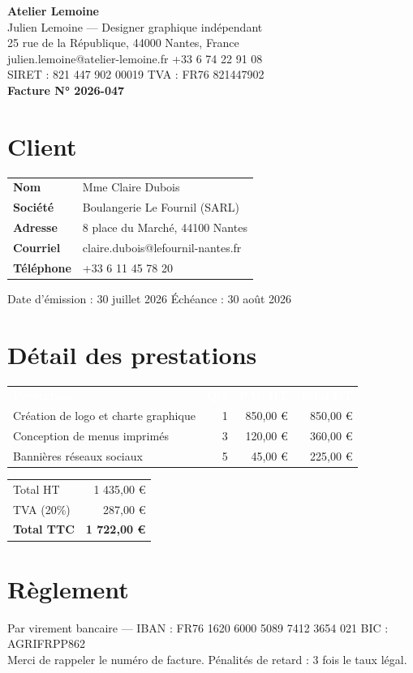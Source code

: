 \documentclass[11pt,a4paper]{article}
\begin{document}
{\Huge\bfseries\color{accent} Atelier Lemoine}\\[0.2em]
{\normalsize Julien Lemoine — Designer graphique indépendant}\\
25 rue de la République, 44000 Nantes, France\\
julien.lemoine@atelier-lemoine.fr \quad +33 6 74 22 91 08\\
SIRET : 821 447 902 00019 \quad TVA : FR76 821447902\\[0.8em]
{\LARGE\bfseries Facture N° 2026-047}

\section{Client}
\begin{tabularx}{\linewidth}{@{}>{\bfseries}l X@{}}
Nom & Mme Claire Dubois \\
Société & Boulangerie Le Fournil (SARL) \\
Adresse & 8 place du Marché, 44100 Nantes \\
Courriel & claire.dubois@lefournil-nantes.fr \\
Téléphone & +33 6 11 45 78 20 \\
\end{tabularx}

\vspace{0.5em}
Date d'émission : 30 juillet 2026 \quad Échéance : 30 août 2026

\section{Détail des prestations}
\begin{tabularx}{\linewidth}{@{}X r r r@{}}
\rowcolor{accent}\textcolor{white}{\textbf{Prestation}} & \textcolor{white}{\textbf{Qté}} & \textcolor{white}{\textbf{P.U. HT}} & \textcolor{white}{\textbf{Total HT}} \\
Création de logo et charte graphique & 1 & 850,00 € & 850,00 € \\
\rowcolor{rowgray} Conception de menus imprimés & 3 & 120,00 € & 360,00 € \\
Bannières réseaux sociaux & 5 & 45,00 € & 225,00 € \\
\end{tabularx}

\vspace{0.5em}
\hfill
\begin{tabularx}{0.5\linewidth}{@{}X r@{}}
Total HT & 1 435,00 € \\
TVA (20\%) & 287,00 € \\
\textbf{Total TTC} & \textbf{1 722,00 €} \\
\end{tabularx}

\section{Règlement}
Par virement bancaire — IBAN : FR76 1620 6000 5089 7412 3654 021 \quad BIC : AGRIFRPP862\\
Merci de rappeler le numéro de facture. Pénalités de retard : 3 fois le taux légal.
\end{document}
